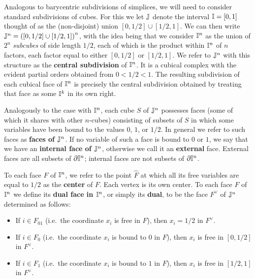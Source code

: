 Analogous to barycentric subdivisions of simplices, we will need to consider standard subdivisions of cubes.
For this we let $\mathbb{J}$ denote the interval $\mathbb{I} = [0,1]$ thought of as the (non-disjoint) union $[0,1/2] \cup [1/2,1]$.
We can then write  $\mathbb{J}^n = \left([0,1/2] \cup [1/2,1]\right)^n$, with the idea being that we consider $\mathbb{I}^n$ as the union of $2^n$ \textit{subcubes} of side length $1/2$, each of which is the product within $\mathbb{I}^n$ of $n$ factors, each factor equal to either $[0,1/2]$ or $[1/2,1]$.
We refer to $\mathbb{J}^n$ with this structure as the \textbf{central subdivision} of $\mathbb{I}^n$.
It is a cubical complex with the evident partial orders obtained from $0 < 1/2 < 1$.
The resulting subdivision of each cubical face of $\mathbb{I}^n$ is precisely the central subdivision obtained by treating that face as some $\mathbb{I}^k$ in its own right.

Analogously to the case with $\mathbb{I}^n$, each cube $S$ of $\mathbb{J}^n$ possesses faces (some of which it shares with other $n$-cubes) consisting of subsets of $S$ in which some variables have been bound to the values $0$, $1$, or $1/2$.
In general we refer to such faces as \textbf{faces of $\mathbb{J}^n$}.
If no variable of such a face is bound to $0$ or $1$, we say that we have an \textbf{internal face of $\mathbb{J}^n$}, otherwise we call it an \textbf{external} face.
External faces are all subsets of $\partial \mathbb{I}^n$; internal faces are not subsets of $\partial \mathbb{I}^n$.

To each face $F$ of $\mathbb{I}^n$, we refer to the point $\hat F$  at which all its free variables are equal to $1/2$ as the \textbf{center} of $F$.
Each vertex is its own center.
To each face $F$ of $\mathbb{I}^n$ we define its \textbf{dual face in $\mathbb{I}^n$}, or simply its \textbf{dual}, to be the face $F^\vee$  of $\mathbb{J}^n$ determined as follows:
\begin{itemize}
	\item If $i \in F_{01}$ (i.e.\ the coordinate $x_i$ is free in $F$), then $x_i = 1/2$ in $F^\vee$.

	\item If $i \in F_0$ (i.e.\ the coordinate $x_i$ is bound to $0$ in $F$), then $x_i$ is free in $[0,1/2]$ in $F^\vee$.

	\item If $i \in F_1$ (i.e.\ the coordinate $x_i$ is bound to $1$ in $F$), then $x_i$ is free in $[1/2,1]$ in $F^\vee$.
\end{itemize}

